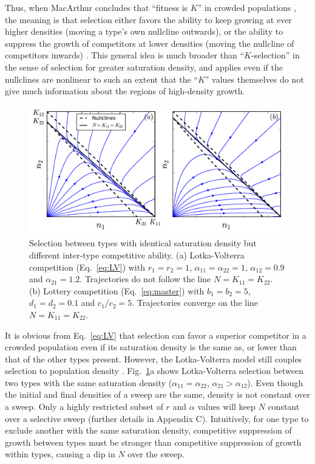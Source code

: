 \documentclass[12pt]{article}
\begin{document}
Thus, when MacArthur concludes that  ``fitness is $K$'' in crowded populations \citep[pp. 149]{macarthur_1967}, the meaning is that selection either favors the ability to keep growing at ever higher densities (moving a type's own nullcline outwards), or the ability to suppress the growth of competitors at lower densities (moving the nullcline of competitors inwards) \citep{gill_1974}. This general idea is much broader than ``$K$-selection'' in the sense of selection for greater saturation density, and applies even if the nullclines are nonlinear to such an extent that the ``$K$'' values themselves do not give much information about the regions of high-density growth.

\begin{figure}
\centering
\includegraphics[scale=0.8]{LVvslottery.pdf}
\caption{\label{fig:LVvslottery} Selection between types with identical saturation density but different inter-type competitive ability. (a) Lotka-Volterra competition (Eq.~\ref{eq:LV}) with $r_1=r_2=1$, $\alpha_{11}=\alpha_{22}=1$, $\alpha_{12}=0.9$ and $\alpha_{21}=1.2$. Trajectories do not follow the line $N=K_{11}=K_{22}$. (b) Lottery competition (Eq.~\ref{eq:master}) with $b_1=b_2=5$, $d_1=d_2=0.1$ and $c_1/c_2=5$. Trajectories converge on the line $N=K_{11}=K_{22}$.}
\end{figure}

It is obvious from Eq.~\eqref{eq:LV} that selection can favor a superior competitor in a crowded population even if its saturation density is the same as, or lower than that of the other types present. However, the Lotka-Volterra model still couples selection to population density \citep{smouse_1976}. Fig.~\ref{fig:LVvslottery}a shows Lotka-Volterra selection between two types with the same saturation density ($\alpha_{11}=\alpha_{22}$, $\alpha_{21}>\alpha_{12}$). Even though the initial and final densities of a sweep are the same, density is not constant over a sweep. Only a highly restricted subset of $r$ and $\alpha$ values will keep $N$ constant over a selective sweep (further details in Appendix C). Intuitively, for one type to exclude another with the same saturation density, competitive suppression of growth between types must be stronger than competitive suppression of growth within types, causing a dip in $N$ over the sweep. 
\end{document}
